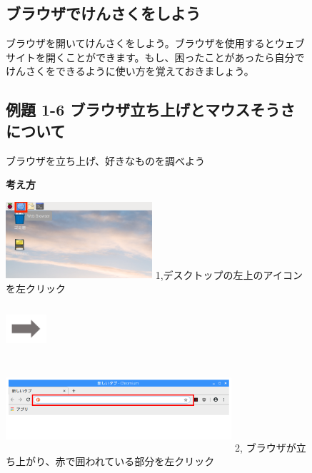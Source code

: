 \documentclass[a4paper,12pt]{jarticle}
\begin{document}
\begin{figure}[t]
\subsection{ブラウザでけんさくをしよう}
ブラウザを開いてけんさくをしよう。ブラウザを使用するとウェブサイトを開くことができます。もし、困ったことがあったら自分でけんさくをできるように使い方を覚えておきましょう。

\subsection{例題 1-6
ブラウザ立ち上げとマウスそうさについて}
ブラウザを立ち上げ、好きなものを調べよう

{\bf\large 考え方}

	\begin{minipage}{\textwidth}
\begin{minipage}{6.204cm}
\includegraphics[width=5.426cm,height=2.849cm]{textbook-img071.png}
1,デスクトップの左上のアイコンを左クリック
\end{minipage}
\includegraphics[width=1.505cm,height=1.707cm]{textbook-img073.png}
\begin{minipage}{8.233cm}
\includegraphics[width=8.373cm,height=3.193cm]{textbook-img075.png}
2,
ブラウザが立ち上がり、赤で囲われている部分を左クリック
\end{minipage}
	\end{minipage}


\end{figure}
\end{document}
